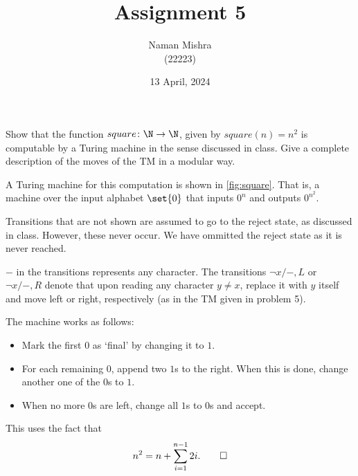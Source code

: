 \documentclass[12pt]{article}
\title      {Assignment 5}
\author{Naman Mishra\\
(22223)}
\date{13 April, 2024}
\begin{document}
\maketitle
\begin{problem*}
    Show that the function $square\colon \N \to \N$, given by
    $square(n) = n^2$ is computable by a Turing machine in the sense
    discussed in class.
    Give a complete description of the moves of the TM in a modular way.
\end{problem*}
\begin{solution}
    A Turing machine for this computation is shown in \cref{fig:square}.
    That is, a machine over the input alphabet $\set{0}$ that inputs
    $0^n$ and outputs $0^{n^2}$.

    Transitions that are not shown are assumed to go to the reject state,
    as discussed in class.
    However, these never occur.
    We have ommitted the reject state as it is never reached.

    $-$ in the transitions represents any character.
    The transitions $\neg x/{-}, L$ or $\neg x/{-}, R$ denote that upon
    reading any character $y \ne x$, replace it with $y$ itself and move
    left or right, respectively (as in the TM given in problem 5).

    The machine works as follows:
    \begin{itemize}
        \item Mark the first $0$ as `final' by changing it to $1$.
        \item For each remaining $0$, append two $1$s to the right.
        When this is done, change another one of the $0$s to $1$.
        \item When no more $0$s are left, change all $1$s to $0$s
        and accept.
    \end{itemize}
    This uses the fact that \[
        n^2 = n + \sum_{i=1}^{n-1} 2i. \qedhere
    \]
    \begin{figure}
        \centering
\end{figure}
\end{solution}
\end{document}
